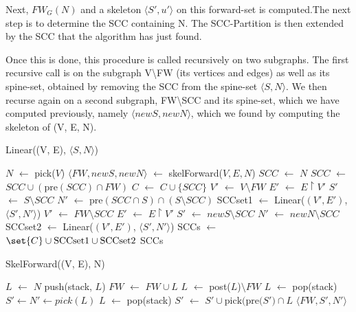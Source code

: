 \documentclass[../master/master.tex]{subfiles}
\newcommand{\FW}[2][G]{\ensuremath{FW_{#1}(#2)}}
\newcommand{\pair}[2]{\ensuremath{\langle #1, #2\rangle}}
\newcommand*\Let[2]{\State #1 $\gets$ #2}
\begin{document}
Next, \FW{N} and a skeleton \pair{S'}{u'} on this forward-set is computed.The next step is to determine the SCC containing N. The SCC-Partition is then extended by the SCC that the algorithm has just found. 

Once this is done, this procedure is called recursively on two subgraphs. The first recursive call is on the subgraph V\textbackslash FW (its vertices and edges) as well as its spine-set, obtained by removing the SCC from the spine-set \pair{S}{N}. We then recurse again on a second subgraph, FW\textbackslash SCC and its spine-set, which we have computed previously, namely \pair{newS}{newN}, which we found by computing the skeleton of (V, E, N).


\begin{algorithm}[H]
  \caption{Linear((V, E), \pair{S}{N})}
  \begin{algorithmic}[1]
     \State \Return
    \EndIf
    \Statex
      \Let{$N$}{pick($V$)}
    \EndIf
    \Statex
    \Let{$\langle FW, newS, newN\rangle$}{skelForward($V, E, N$)}
    \Statex
    \Let{$SCC$}{$N$}
     \Let{$SCC$}{$SCC\cup (\text{pre}(SCC)\cap FW)$}
    \EndWhile
    \Statex
    \Let{$C$}{$C\cup\{SCC\}$}
    \Statex
    \Let{$V'$}{$V\setminus FW$}
    \Let{$E'$}{$E\upharpoonright V'$}
    \Let{$S'$}{$S\setminus SCC$}
    \Let{$N'$}{$\text{pre}(SCC\cap S)\cap(S\setminus SCC)$}
    \Let{SCCset1}{Linear($(V', E')$, \pair{S'}{N'})}
    \Statex
    \Let{$V'$}{$FW\setminus SCC$}
    \Let{$E'$}{$E\upharpoonright V'$}
    \Let{$S'$}{$newS\setminus SCC$}
    \Let{$N'$}{$newN\setminus SCC$}
    \Let{SCCset2}{Linear($(V', E')$, \pair{S'}{N'})}
    \Statex
    \Let{SCCs}{$\set{C}\cup \text{SCCset1} \cup \text{SCCset2}$}
    \State \Return SCCs
  \end{algorithmic}
\end{algorithm}

\begin{algorithm}[H]
  \caption{SkelForward((V, E), N)}
  \begin{algorithmic}[1]
    \Let{$L$}{$N$}
    \Statex
    \State push(stack, $L$)
    \Let{$FW$}{$FW\cup L$}
    \Let{$L$}{post($L$)$\setminus FW$}
    \EndWhile
    \Statex
    \Let{$L$}{pop(stack)}
    \State $S' \gets N' \gets pick(L)$
    \Let{$L$}{pop(stack)}
    \Let{$S'$}{$S'\cup\text{pick(pre(}S')\cap L$}
    \EndWhile
    \Statex
    \State \Return $\langle FW, S', N' \rangle$
  \end{algorithmic}
\end{algorithm}

\end{document}
